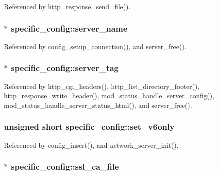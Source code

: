 Referenced by http\-\_\-response\-\_\-send\-\_\-file().

\hypertarget{structspecific__config_a6383e0621886e13fe6cf603cd22f9f84}{
\subsubsection[{server\-\_\-name}]{$\ast$ specific\-\_\-config\-::server\-\_\-name}}\label{structspecific__config_a6383e0621886e13fe6cf603cd22f9f84}


Referenced by config\-\_\-setup\-\_\-connection(), and server\-\_\-free().

\hypertarget{structspecific__config_a008031c9dbac28f6ffa84809857a53e5}{
\subsubsection[{server\-\_\-tag}]{$\ast$ specific\-\_\-config\-::server\-\_\-tag}}\label{structspecific__config_a008031c9dbac28f6ffa84809857a53e5}


Referenced by http\-\_\-cgi\-\_\-headers(), http\-\_\-list\-\_\-directory\-\_\-footer(), http\-\_\-response\-\_\-write\-\_\-header(), mod\-\_\-status\-\_\-handle\-\_\-server\-\_\-config(), mod\-\_\-status\-\_\-handle\-\_\-server\-\_\-status\-\_\-html(), and server\-\_\-free().

\hypertarget{structspecific__config_a27873c71fdc9f8c23aff4dff3dcb2abe}{
\subsubsection[{set\-\_\-v6only}]{\setlength{\rightskip}{0pt plus 5cm}unsigned short specific\-\_\-config\-::set\-\_\-v6only}}\label{structspecific__config_a27873c71fdc9f8c23aff4dff3dcb2abe}


Referenced by config\-\_\-insert(), and network\-\_\-server\-\_\-init().

\hypertarget{structspecific__config_af9ab1dd5a3da47ae520fe26ea43ac36b}{
\subsubsection[{ssl\-\_\-ca\-\_\-file}]{$\ast$ specific\-\_\-config\-::ssl\-\_\-ca\-\_\-file}}\label{structspecific__config_af9ab1dd5a3da47ae520fe26ea43ac36b}


